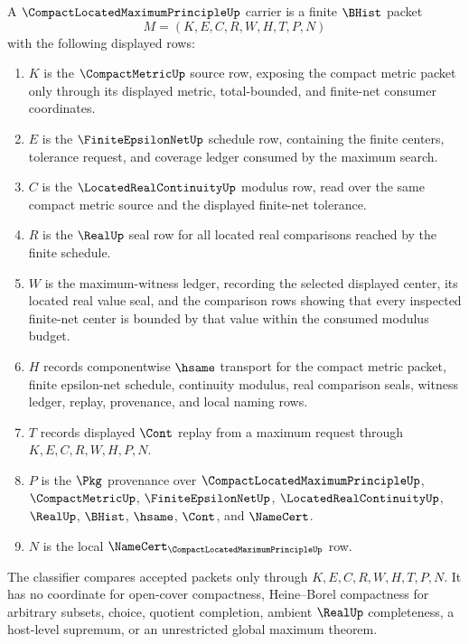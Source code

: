 \begin{definition}
\label{def:compact-located-maximum-principle-carrier}
A $\CompactLocatedMaximumPrincipleUp$ carrier is a finite $\BHist$ packet
$$
M=(K,E,C,R,W,H,T,P,N)
$$
with the following displayed rows:
\begin{enumerate}
\item $K$ is the $\CompactMetricUp$ source row, exposing the compact metric packet only through its displayed metric, total-bounded, and finite-net consumer coordinates.
\item $E$ is the $\FiniteEpsilonNetUp$ schedule row, containing the finite centers, tolerance request, and coverage ledger consumed by the maximum search.
\item $C$ is the $\LocatedRealContinuityUp$ modulus row, read over the same compact metric source and the displayed finite-net tolerance.
\item $R$ is the $\RealUp$ seal row for all located real comparisons reached by the finite schedule.
\item $W$ is the maximum-witness ledger, recording the selected displayed center, its located real value seal, and the comparison rows showing that every inspected finite-net center is bounded by that value within the consumed modulus budget.
\item $H$ records componentwise $\hsame$ transport for the compact metric packet, finite epsilon-net schedule, continuity modulus, real comparison seals, witness ledger, replay, provenance, and local naming rows.
\item $T$ records displayed $\Cont$ replay from a maximum request through $K,E,C,R,W,H,P,N$.
\item $P$ is the $\Pkg$ provenance over $\CompactLocatedMaximumPrincipleUp$, $\CompactMetricUp$, $\FiniteEpsilonNetUp$, $\LocatedRealContinuityUp$, $\RealUp$, $\BHist$, $\hsame$, $\Cont$, and $\NameCert$.
\item $N$ is the local $\NameCert_{\CompactLocatedMaximumPrincipleUp}$ row.
\end{enumerate}
The classifier compares accepted packets only through $K,E,C,R,W,H,T,P,N$. It has no coordinate for open-cover compactness, Heine--Borel compactness for arbitrary subsets, choice, quotient completion, ambient $\RealUp$ completeness, a host-level supremum, or an unrestricted global maximum theorem.
\end{definition}

